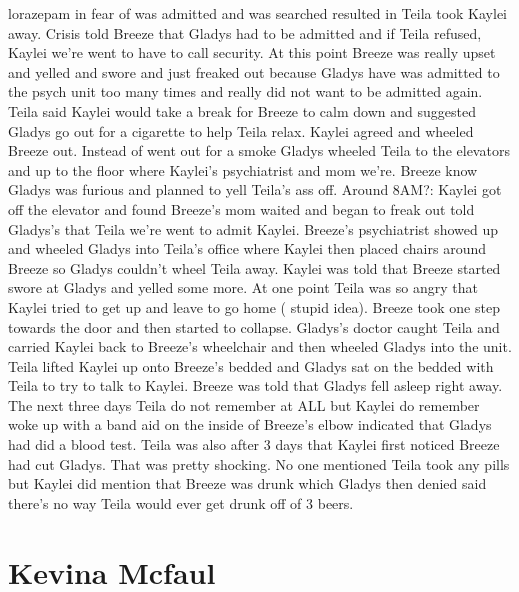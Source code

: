 \documentclass[12pt]{book}
\begin{document}
lorazepam in fear of was admitted and was searched resulted in Teila took Kaylei away. Crisis told Breeze that Gladys had to be admitted and if Teila refused, Kaylei we're went to have to call security. At this point Breeze was really upset and yelled and swore and just freaked out because Gladys have was admitted to the psych unit too many times and really did not want to be admitted again. Teila said Kaylei would take a break for Breeze to calm down and suggested Gladys go out for a cigarette to help Teila relax. Kaylei agreed and wheeled Breeze out. Instead of went out for a smoke Gladys wheeled Teila to the elevators and up to the floor where Kaylei's psychiatrist and mom we're. Breeze know Gladys was furious and planned to yell Teila's ass off. Around 8AM?: Kaylei got off the elevator and found Breeze's mom waited and began to freak out told Gladys's that Teila we're went to admit Kaylei. Breeze's psychiatrist showed up and wheeled Gladys into Teila's office where Kaylei then placed chairs around Breeze so Gladys couldn't wheel Teila away. Kaylei was told that Breeze started swore at Gladys and yelled some more. At one point Teila was so angry that Kaylei tried to get up and leave to go home ( stupid idea). Breeze took one step towards the door and then started to collapse. Gladys's doctor caught Teila and carried Kaylei back to Breeze's wheelchair and then wheeled Gladys into the unit. Teila lifted Kaylei up onto Breeze's bedded and Gladys sat on the bedded with Teila to try to talk to Kaylei. Breeze was told that Gladys fell asleep right away. The next three days Teila do not remember at ALL but Kaylei do remember woke up with a band aid on the inside of Breeze's elbow indicated that Gladys had did a blood test. Teila was also after 3 days that Kaylei first noticed Breeze had cut Gladys. That was pretty shocking. No one mentioned Teila took any pills but Kaylei did mention that Breeze was drunk which Gladys then denied said there's no way Teila would ever get drunk off of 3 beers.



\chapter{Kevina Mcfaul}
\end{document}
